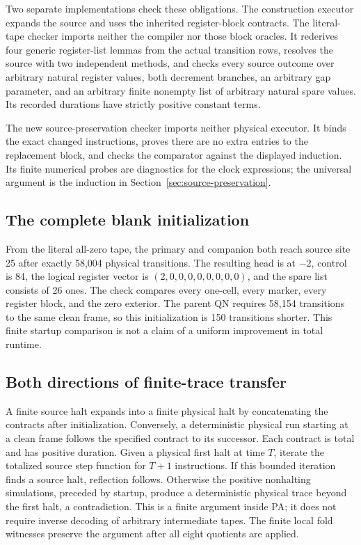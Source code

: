 \documentclass[11pt,letterpaper]{article}
\begin{document}
Two separate implementations check these obligations. The construction
executor expands the source and uses the inherited register-block
contracts. The literal-tape checker imports neither the compiler nor
those block oracles. It rederives four generic register-list lemmas from
the actual transition rows, resolves the source with two independent
methods, and checks every source outcome over arbitrary natural register
values, both decrement branches, an arbitrary gap parameter, and an
arbitrary finite nonempty list of arbitrary natural spare values.
Its recorded durations have strictly positive constant terms.

The new source-preservation checker imports neither physical executor.
It binds the exact changed instructions, proves there are no extra
entries to the replacement block, and checks the comparator against the
displayed induction. Its finite numerical probes are diagnostics for the
clock expressions; the universal argument is the induction in
Section~\ref{sec:source-preservation}.

\subsection{The complete blank initialization}

From the literal all-zero tape, the primary and companion both reach
source site 25 after exactly 58,004 physical transitions. The resulting
head is at $-2$, control is 84, the logical register vector is
$(2,0,0,0,0,0,0,0,0)$, and the spare list consists of 26 ones. The check
compares every one-cell, every marker, every register block, and the zero
exterior. The parent QN requires 58,154 transitions to the same clean
frame, so this initialization is 150 transitions shorter. This finite
startup comparison is not a claim of a uniform improvement in total
runtime.

\subsection{Both directions of finite-trace transfer}

A finite source halt expands into a finite physical halt by concatenating
the contracts after initialization. Conversely, a deterministic physical
run starting at a clean frame follows the specified contract to its
successor. Each contract is total and has positive duration. Given a
physical first halt at time $T$, iterate the totalized source step
function for $T+1$ instructions. If this bounded iteration finds a source
halt, reflection follows. Otherwise the positive nonhalting simulations,
preceded by startup, produce a deterministic physical trace beyond the
first halt, a contradiction. This is a finite argument inside PA; it
does not require inverse decoding of arbitrary intermediate tapes.
The finite local fold witnesses preserve the argument after all eight
quotients are applied.
\end{document}
